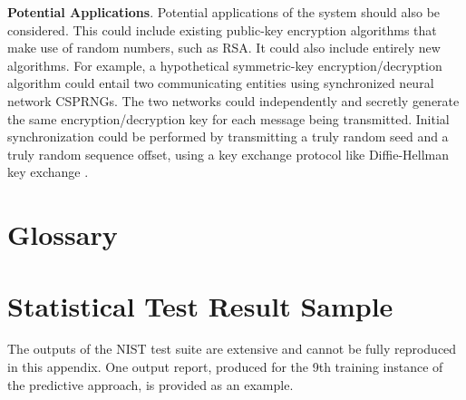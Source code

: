\documentclass[12pt, titlepage]{report}
\theoremstyle{definition}
\begin{document}
{\textbf{Potential Applications}. Potential applications of the system should also be considered. This could include existing public-key encryption algorithms that make use of random numbers, such as RSA. It could also include entirely new algorithms. For example, a hypothetical symmetric-key encryption/decryption algorithm could entail two communicating entities using synchronized neural network CSPRNGs. The two networks could independently and secretly generate the same encryption/decryption key for each message being transmitted. Initial synchronization could be performed by transmitting a truly random seed and a truly random sequence offset, using a key exchange protocol like Diffie-Hellman key exchange \cite[p. 174-177]{anderson2010security}.










\appendix
\chapter{Glossary}



\chapter{Statistical Test Result Sample}\label{appendix:sample}
The outputs of the NIST test suite are extensive and cannot be fully reproduced in this appendix. One output report, produced for the 9th training instance of the predictive approach, is provided as an example.

}
\end{document}
